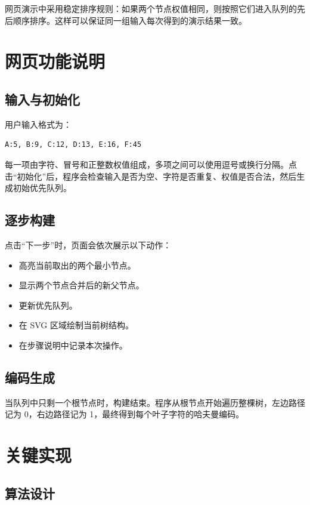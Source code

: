 \documentclass[UTF8,a4paper,12pt]{ctexart}
\begin{document}
网页演示中采用稳定排序规则：如果两个节点权值相同，则按照它们进入队列的先后顺序排序。这样可以保证同一组输入每次得到的演示结果一致。

\section{网页功能说明}

\subsection{输入与初始化}

用户输入格式为：

\begin{lstlisting}
A:5, B:9, C:12, D:13, E:16, F:45
\end{lstlisting}

每一项由字符、冒号和正整数权值组成，多项之间可以使用逗号或换行分隔。点击“初始化”后，程序会检查输入是否为空、字符是否重复、权值是否合法，然后生成初始优先队列。

\subsection{逐步构建}

点击“下一步”时，页面会依次展示以下动作：

\begin{itemize}
  \item 高亮当前取出的两个最小节点。
  \item 显示两个节点合并后的新父节点。
  \item 更新优先队列。
  \item 在 SVG 区域绘制当前树结构。
  \item 在步骤说明中记录本次操作。
\end{itemize}

\subsection{编码生成}

当队列中只剩一个根节点时，构建结束。程序从根节点开始遍历整棵树，左边路径记为 0，右边路径记为 1，最终得到每个叶子字符的哈夫曼编码。

\section{关键实现}

\subsection{算法设计}
\end{document}
